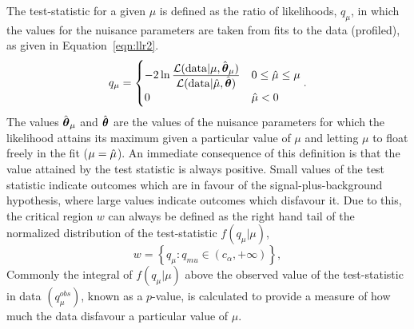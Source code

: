 The test-statistic for a given $\mu$ is defined as the ratio 
of likelihoods, $q_{\mu}$, in which the values for the nuisance parameters are taken from fits to the data (profiled), 
as given in Equation~\ref{eqn:llr2}. 
\begin{equation}
q_{\mu} = 
	\begin {cases} 
	-2\ln\frac{\displaystyle \mathcal{L}(\mathrm{data} | \mu,\hat{{\boldsymbol{\theta}}}_{\mu})}
	{\displaystyle \mathcal{L}(\mathrm{data} | \hat{\mu},\hat{{\boldsymbol{\theta}}})} 
		&  0 \le \hat{\mu} \le \mu \\
	 0 	&  \hat{\mu} < 0
	\end{cases}.
\label{eqn:llr2}
\end{equation}
The values $\hat{{\boldsymbol{\theta}}}_{\mu}$ and $\hat{{\boldsymbol{\theta}}}$ are the values of 
the nuisance parameters for which the likelihood attains its maximum 
given a particular value of $\mu$ and letting $\mu$ to float freely in the 
fit ($\mu=\hat{\mu}$).
An immediate consequence of this definition is that the value attained
by the test statistic is always positive. Small values of the test
statistic indicate outcomes which are in favour of the signal-plus-background 
hypothesis, where large values indicate outcomes which disfavour it.
Due to this, the critical region $w$ can always be defined as the right
hand tail of the normalized distribution of the test-statistic $f(q_{\mu}|\mu)$, 
\begin{equation}
w = \left\{ q_{\mu} : q_{mu} \in (c_{\alpha},+\infty) \right\},
\end{equation}
Commonly the integral of $f(q_{\mu}|\mu)$ above the observed value of the 
test-statistic in data $(q_{\mu}^{obs})$, known as a $p$-value, is calculated
to provide a measure of how much the data disfavour a particular value of $\mu$. 

